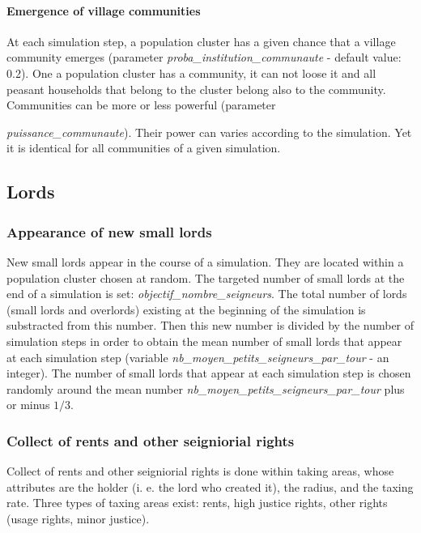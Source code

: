 \documentclass[a4paper,11pt]{article}
\begin{document}
\paragraph{Emergence of village communities}
At each simulation step, a population cluster has a given chance that a village community emerges (parameter \textit{proba\_institution\_communaute} - default value: 0.2). One a population cluster has a community, it can not loose it and all peasant households that belong to the cluster belong also to the community. Communities can be more or less powerful (parameter {\textit{puissance\_communaute}). Their power can varies according to the simulation. Yet it is identical for all communities of a given simulation.


\subsection{Lords}

\subsubsection{Appearance of new small lords}

New small lords appear in the course of a simulation. They are located within a population cluster chosen at random. The targeted number of small lords at the end of a simulation is set: \textit{objectif\_nombre\_seigneurs}. The total number of lords (small lords and overlords) existing at the beginning of the simulation is substracted from this number. Then this new number is divided by the number of simulation steps in order to obtain the mean number of small lords that appear at each simulation step  (variable \textit{nb\_moyen\_petits\_seigneurs\_par\_tour} - an integer). The number of small lords that appear at each simulation step is chosen randomly around the mean number \textit{nb\_moyen\_petits\_seigneurs\_par\_tour} plus or minus $1/3$.


\subsubsection{Collect of rents and other seigniorial rights}

Collect of rents and other seigniorial rights is done within taking areas, whose attributes are the holder (i. e. the lord who created it), the radius, and the taxing rate. Three types of taxing areas exist: rents, high justice rights, other rights (usage rights, minor justice).

}
\end{document}
